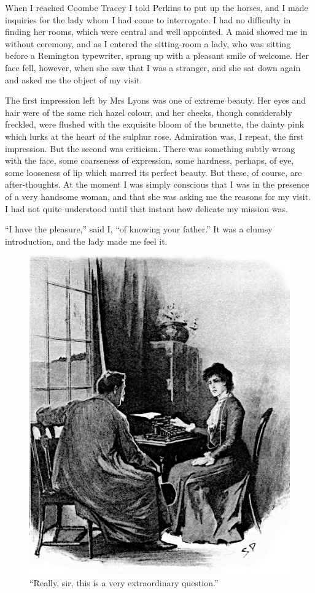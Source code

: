 \documentclass[paper=5.5in:8.5in,BCOR=7mm,twoside,DIV=calc,12pt,usegeometry,openany,chapterprefix,endperiod]{scrbook} %
\begin{document}
When I reached Coombe Tracey I told Perkins to put up the horses, and I made inquiries for the lady whom I had come to interrogate. I had no difficulty in finding her rooms, which were central and well appointed. A maid showed me in without ceremony, and as I entered the sitting-room a lady, who was sitting before a Remington typewriter, sprang up with a pleasant smile of welcome. Her face fell, however, when she saw that I was a stranger, and she sat down again and asked me the object of my visit.

The first impression left by Mrs Lyons was one of extreme beauty. Her eyes and hair were of the same rich hazel colour, and her cheeks, though considerably freckled, were flushed with the exquisite bloom of the brunette, the dainty pink which lurks at the heart of the sulphur rose. Admiration was, I repeat, the first impression. But the second was criticism. There was something subtly wrong with the face, some coarseness of expression, some hardness, perhaps, of eye, some looseness of lip which marred its perfect beauty. But these, of course, are after-thoughts. At the moment I was simply conscious that I was in the presence of a very handsome woman, and that she was asking me the reasons for my visit. I had not quite understood until that instant how delicate my mission was.

\enquote{I have the pleasure,} said I, \enquote{of knowing your father.} It was a clumsy introduction, and the lady made me feel it.

\begin{figure}[tbph]
\centering
\includegraphics[width=\linewidth]{10_extraordinary}
\caption{\enquote{Really, sir, this is a very extraordinary question.}}
\end{figure}
\end{document}
